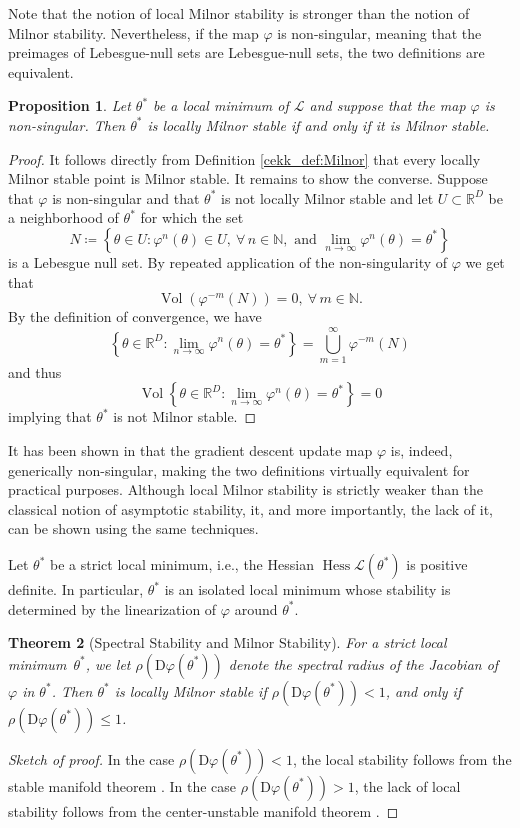 \documentclass[10pt]{article}
\newcommand{\R}{{\mathbb R}}
\def\R{\mathbb{R}}
\newtheorem{theorem}{Theorem}[section]
\newtheorem{proposition}[theorem]{Proposition}
\begin{document}
Note that the notion of local Milnor stability is stronger than the notion of Milnor stability. Nevertheless, if the map $\varphi$ is non-singular, meaning that the preimages of Lebesgue-null sets are Lebesgue-null sets, the two definitions are equivalent.

\begin{proposition}\label{cekk_prop:LocGlobEqui}
	Let $\theta^*$ be a local minimum of $\mathcal L$ and suppose that the map $\varphi$ is non-singular. Then $\theta^*$ is locally Milnor stable if and only if it is Milnor stable.
\end{proposition}
\begin{proof}
	It follows directly from Definition \ref{cekk_def:Milnor} that every locally Milnor stable point is Milnor stable. It remains to show the converse. Suppose that $\varphi$ is non-singular and that $\theta^*$ is not locally Milnor stable and let $U\subset \R^D$ be a neighborhood of $\theta^*$ for which the set
	$$N\coloneqq \left\{\theta \in U : \varphi^n(\theta) \in U,~\forall\,n \in \mathbb N, \text{ and }\lim_{n \to \infty} \varphi^n(\theta) = \theta^*\right\}$$
	is a Lebesgue null set. By repeated application of the non-singularity of $\varphi$ we get that
	$$\operatorname{Vol}\left(\varphi^{-m}(N)\right) = 0, ~\forall\, m \in \mathbb N.$$
	By the definition of convergence, we have
	$$\left\{\theta \in \R^D : \lim_{n \to \infty} \varphi^n(\theta) = \theta^*\right\} = \bigcup_{m = 1}^\infty \varphi^{-m}(N)$$
	and thus 
	$$\operatorname{Vol}\left\{\theta \in \R^D : \lim_{n \to \infty} \varphi^n(\theta) = \theta^*\right\}=0$$
	implying that $\theta^*$ is not Milnor stable.
\end{proof}
It has been shown in \cite[Theorem 12]{Cruaciun24} that the gradient descent update map $\varphi$ is, indeed, generically non-singular, making the two definitions virtually equivalent for practical purposes. Although local Milnor stability is strictly weaker than the classical notion of asymptotic stability, it, and more importantly, the lack of it, can be shown using the same techniques.


Let $\theta^*$ be a strict local minimum, i.e., the Hessian $\operatorname{Hess} \mathcal L(\theta^*)$ is positive definite. In particular, $\theta^*$ is an isolated local minimum whose stability is determined by the linearization of $\varphi$ around $\theta^*$. 
\begin{theorem}[Spectral Stability and Milnor Stability]
	For a strict local minimum~$\theta^*$, we let $\rho(\mathrm D \varphi(\theta^*))$ denote the spectral radius of the Jacobian of $\varphi$ in $\theta^*$. Then $\theta^*$ is locally Milnor stable if $\rho(\mathrm D \varphi(\theta^*))< 1$, and only if $\rho(\mathrm D \varphi(\theta^*))\leq 1$.
\end{theorem}
\begin{proof}[Sketch of proof]
	In the case $\rho(\mathrm D \varphi(\theta^*))< 1$, the local stability follows from the stable manifold theorem \cite[Section 6.2]{Katok1995}. In the case $\rho(\mathrm D \varphi(\theta^*))> 1$, the lack of local stability follows from the center-unstable manifold theorem \cite[Section 6.2]{Katok1995}.
\end{proof}
\end{document}
